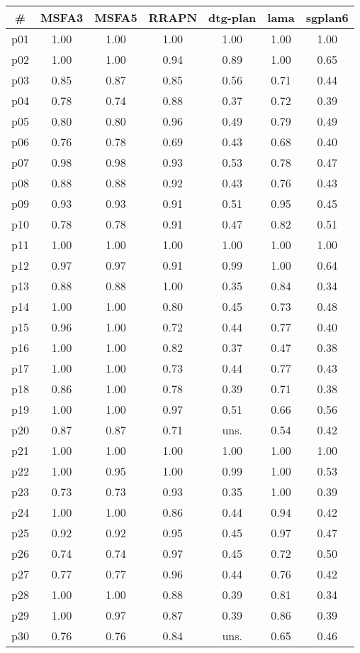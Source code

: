 \begin{tabular}{c||c|c|c|c|c|c}
\textbf{\#} & \textbf{MSFA3} & \textbf{MSFA5} & \textbf{RRAPN} & \textbf{dtg-plan} & \textbf{lama} & \textbf{sgplan6}\\
\hline
\hline
p01 & 1.00 & 1.00 & 1.00 & 1.00 & 1.00 & 1.00\\
p02 & 1.00 & 1.00 & 0.94 & 0.89 & 1.00 & 0.65\\
p03 & 0.85 & 0.87 & 0.85 & 0.56 & 0.71 & 0.44\\
p04 & 0.78 & 0.74 & 0.88 & 0.37 & 0.72 & 0.39\\
p05 & 0.80 & 0.80 & 0.96 & 0.49 & 0.79 & 0.49\\
p06 & 0.76 & 0.78 & 0.69 & 0.43 & 0.68 & 0.40\\
p07 & 0.98 & 0.98 & 0.93 & 0.53 & 0.78 & 0.47\\
p08 & 0.88 & 0.88 & 0.92 & 0.43 & 0.76 & 0.43\\
p09 & 0.93 & 0.93 & 0.91 & 0.51 & 0.95 & 0.45\\
p10 & 0.78 & 0.78 & 0.91 & 0.47 & 0.82 & 0.51\\
p11 & 1.00 & 1.00 & 1.00 & 1.00 & 1.00 & 1.00\\
p12 & 0.97 & 0.97 & 0.91 & 0.99 & 1.00 & 0.64\\
p13 & 0.88 & 0.88 & 1.00 & 0.35 & 0.84 & 0.34\\
p14 & 1.00 & 1.00 & 0.80 & 0.45 & 0.73 & 0.48\\
p15 & 0.96 & 1.00 & 0.72 & 0.44 & 0.77 & 0.40\\
p16 & 1.00 & 1.00 & 0.82 & 0.37 & 0.47 & 0.38\\
p17 & 1.00 & 1.00 & 0.73 & 0.44 & 0.77 & 0.43\\
p18 & 0.86 & 1.00 & 0.78 & 0.39 & 0.71 & 0.38\\
p19 & 1.00 & 1.00 & 0.97 & 0.51 & 0.66 & 0.56\\
p20 & 0.87 & 0.87 & 0.71 & uns. & 0.54 & 0.42\\
p21 & 1.00 & 1.00 & 1.00 & 1.00 & 1.00 & 1.00\\
p22 & 1.00 & 0.95 & 1.00 & 0.99 & 1.00 & 0.53\\
p23 & 0.73 & 0.73 & 0.93 & 0.35 & 1.00 & 0.39\\
p24 & 1.00 & 1.00 & 0.86 & 0.44 & 0.94 & 0.42\\
p25 & 0.92 & 0.92 & 0.95 & 0.45 & 0.97 & 0.47\\
p26 & 0.74 & 0.74 & 0.97 & 0.45 & 0.72 & 0.50\\
p27 & 0.77 & 0.77 & 0.96 & 0.44 & 0.76 & 0.42\\
p28 & 1.00 & 1.00 & 0.88 & 0.39 & 0.81 & 0.34\\
p29 & 1.00 & 0.97 & 0.87 & 0.39 & 0.86 & 0.39\\
p30 & 0.76 & 0.76 & 0.84 & uns. & 0.65 & 0.46\\
\end{tabular}


